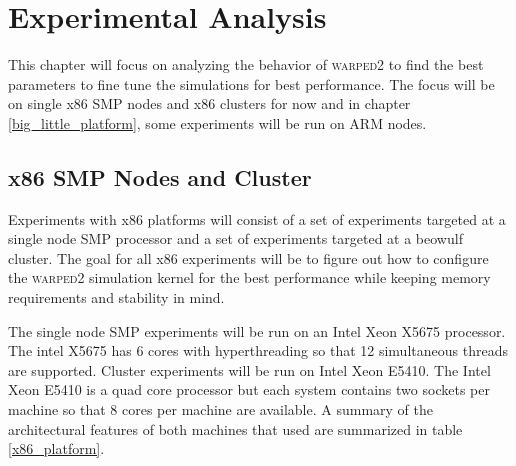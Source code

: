 \documentclass[11pt]{book}
\begin{document}
\chapter{Experimental Analysis}\label{experimental_analysis}

This chapter will focus on analyzing the behavior of \textsc{warped2} to find the best parameters
to fine tune the simulations for best performance. The focus will be on single x86 SMP nodes
and x86 clusters for now and in chapter \ref{big_little_platform}, some experiments will be
run on ARM nodes.

\section{x86 SMP Nodes and Cluster}

Experiments with x86 platforms will consist of a set of experiments targeted at a single node
SMP processor and a set of experiments targeted at a beowulf cluster. The goal for all x86
experiments will be to figure out how to configure the \textsc{warped2} simulation kernel for
the best performance while keeping memory requirements and stability in mind.

The single node SMP experiments will be run on an Intel Xeon X5675 processor. The intel X5675
has 6 cores with hyperthreading so that 12 simultaneous threads are supported.
Cluster experiments will be run on Intel Xeon E5410. The Intel Xeon E5410 is a quad core processor
but each system contains two sockets per machine so that 8 cores per machine are available.
A summary of the architectural features of both machines that used are summarized in table
\ref{x86_platform}.

\pagebreak
\end{document}
